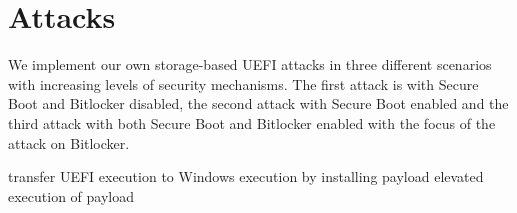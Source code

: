 
\chapter{Attacks}

We implement our own storage-based \ac{UEFI} attacks in three different scenarios with increasing levels of security mechanisms. The first attack is with Secure Boot and Bitlocker disabled, the second attack with Secure Boot enabled and the third attack with both Secure Boot and Bitlocker enabled with the focus of the attack on Bitlocker.

transfer UEFI execution to Windows execution by installing payload
elevated execution of payload



